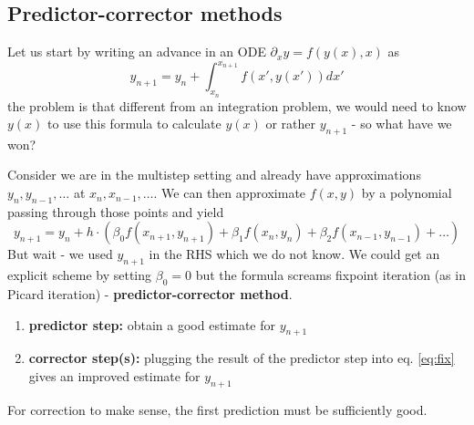 
\subsection{Predictor-corrector methods}

Let us start by writing an advance in an ODE $\partial_x y = f(y(x),x)$ as
\begin{equation}
  y_{n+1} = y_n + \int_{x_n}^{x_{n+1}} f(x',y(x')) dx'
\end{equation}
the problem is that different from an integration problem, we would need
to know $y(x)$ to use this formula to calculate $y(x)$ or rather $y_{n+1}$ - so what have we won?

Consider we are in the multistep setting and already have approximations $y_n,y_{n-1},\dots$
at $x_n,x_{n-1},\dots$. We can then approximate $f(x,y)$ by a polynomial passing through those
points and yield
\begin{equation}
  \label{eq:fix}
  y_{n+1} = y_n + h\cdot (\beta_0 f(x_{n+1},y_{n+1}) + \beta_1 f(x_{n},y_{n}) + \beta_2 f(x_{n-1},y_{n-1}) + \dots)
\end{equation}
But wait - we used $y_{n+1}$ in the RHS which we do not know. We could get an explicit scheme by setting $\beta_0 = 0$
but the formula screams fixpoint iteration (as in Picard iteration) - \textbf{predictor-corrector method}.
\begin{enumerate}
  \item \textbf{predictor step:} obtain a good estimate for $y_{n+1}$
  \item \textbf{corrector step(s):} plugging the result of the predictor step into eq. \ref{eq:fix} gives an improved estimate for $y_{n+1}$
\end{enumerate}
For correction to make sense, the first prediction must be sufficiently good.

